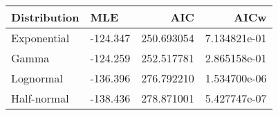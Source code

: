 \begin{tabular}{llrr}
\toprule
Distribution &      MLE &         AIC &          AICw \\
\midrule
 Exponential & -124.347 &  250.693054 &  7.134821e-01 \\
       Gamma & -124.259 &  252.517781 &  2.865158e-01 \\
   Lognormal & -136.396 &  276.792210 &  1.534700e-06 \\
 Half-normal & -138.436 &  278.871001 &  5.427747e-07 \\
\bottomrule
\end{tabular}
